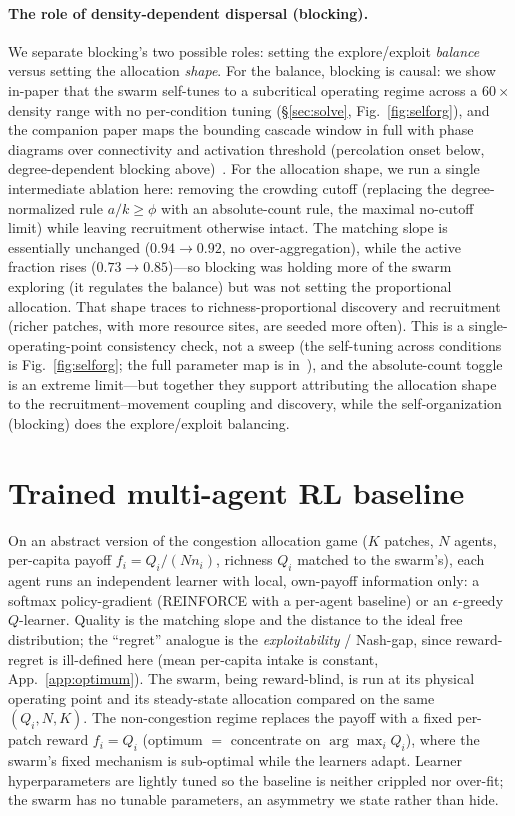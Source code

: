 \documentclass{article}
\begin{document}
\paragraph{The role of density-dependent dispersal (blocking).} We separate blocking's two possible roles:
setting the explore/exploit \emph{balance} versus setting the allocation \emph{shape}. For the balance,
blocking is causal: we show in-paper that the swarm self-tunes to a subcritical operating regime across a
$60\times$ density range with no per-condition tuning (\S\ref{sec:solve}, Fig.~\ref{fig:selforg}), and the
companion paper maps the bounding cascade window in full with phase diagrams over connectivity and activation
threshold (percolation onset below, degree-dependent blocking above)~\citep{partI}. For the allocation shape,
we run a single
intermediate ablation here: removing the crowding cutoff (replacing the degree-normalized rule $a/k\ge\phi$ with
an absolute-count rule, the maximal no-cutoff limit) while leaving recruitment otherwise intact. The matching
slope is essentially unchanged ($0.94\to0.92$, no over-aggregation), while the active fraction rises
($0.73\to0.85$)---so blocking was holding more of the swarm exploring (it regulates the balance) but was not
setting the proportional allocation. That shape traces to richness-proportional discovery and recruitment
(richer patches, with more resource sites, are seeded more often). This is a single-operating-point consistency
check, not a sweep (the self-tuning across conditions is Fig.~\ref{fig:selforg}; the full parameter map is
in~\citep{partI}), and the absolute-count toggle is an extreme limit---but together they support attributing
the allocation shape to the
recruitment--movement coupling and discovery, while the self-organization (blocking) does the
explore/exploit balancing.

\section{Trained multi-agent RL baseline}
\label{app:marl}
On an abstract version of the congestion allocation game ($K$ patches, $N$ agents, per-capita payoff
$f_i=Q_i/(N n_i)$, richness $Q_i$ matched to the swarm's), each agent runs an independent learner with local,
own-payoff information only: a softmax policy-gradient (REINFORCE with a per-agent baseline) or an
$\epsilon$-greedy $Q$-learner. Quality is the matching slope and the distance to the ideal free distribution;
the ``regret'' analogue is the \emph{exploitability} / Nash-gap, since reward-regret is ill-defined here (mean
per-capita intake is constant, App.~\ref{app:optimum}). The swarm, being reward-blind, is run at its physical
operating point and its steady-state allocation compared on the same $(Q_i,N,K)$. The non-congestion regime
replaces the payoff with a fixed per-patch reward $f_i=Q_i$ (optimum $=$ concentrate on $\arg\max_i Q_i$),
where the swarm's fixed mechanism is sub-optimal while the learners adapt. Learner hyperparameters are lightly
tuned so the baseline is neither crippled nor over-fit; the swarm has no tunable parameters, an asymmetry we
state rather than hide.
\end{document}
